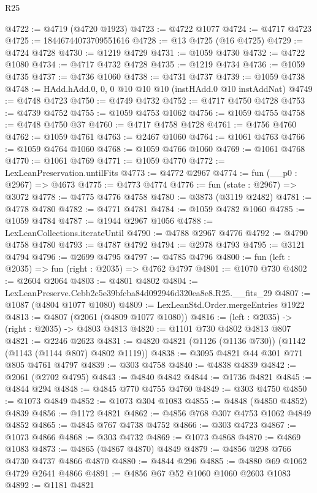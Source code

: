 \begin{lexlean}{R25}
\begin{coremodule}
@4722 := @4719 (@4720 @1923)
@4723 := @4722 @1077
@4724 := @4717 @4723
@4725 := 18446744073709551616
@4728 := @13 @4725 (@16 @4725)
@4729 := @4724 @4728
@4730 := @1219 @4729
@4731 := @1059 @4730
@4732 := @4722 @1080
@4734 := @4717 @4732 @4728
@4735 := @1219 @4734
@4736 := @1059 @4735
@4737 := @4736 @1060
@4738 := @4731 @4737
@4739 := @1059 @4738
@4748 := HAdd.hAdd.{0, 0, 0} @10 @10 @10 (instHAdd.{0} @10 instAddNat)
@4749 := @4748 @4723
@4750 := @4749 @4732
@4752 := @4717 @4750 @4728
@4753 := @4739 @4752
@4755 := @1059 @4753 @1062
@4756 := @1059 @4755
@4758 := @4748 @4750 @37
@4760 := @4717 @4758 @4728
@4761 := @4756 @4760
@4762 := @1059 @4761
@4763 := @2467 @1060
@4764 := @1061 @4763
@4766 := @1059 @4764 @1060
@4768 := @1059 @4766 @1060
@4769 := @1061 @4768
@4770 := @1061 @4769
@4771 := @1059 @4770
@4772 := LexLeanPreservation.untilFits
@4773 := @4772 @2967
@4774 := fun (__p0 : @2967) => @4673
@4775 := @4773 @4774
@4776 := fun (state : @2967) => @3072
@4778 := @4775 @4776 @4758
@4780 := @3873 (@3119 @2482)
@4781 := @4778 @4780
@4782 := @4771 @4781
@4784 := @1059 @4782 @1060
@4785 := @1059 @4784
@4787 := @1944 @2967 @1056
@4788 := LexLeanCollections.iterateUntil
@4790 := @4788 @2967 @4776
@4792 := @4790 @4758 @4780
@4793 := @4787 @4792
@4794 := @2978 @4793
@4795 := @3121 @4794
@4796 := @2699 @4795
@4797 := @4785 @4796
@4800 := fun (left : @2035) => fun (right : @2035) => @4762 @4797
@4801 := @1070 @730
@4802 := @2604 @2064
@4803 := @4801 @4802
@4804 := LexLeanPreserve.Cebb2c5e39bfcba84d092946d320ea8e8.R25.__fits_29
@4807 := @1087 (@4804 @1077 @1080)
@4809 := LexLeanStd.Order.mergeEntries @1922
@4813 := @4807 (@2061 (@4809 @1077 @1080))
@4816 := (left : @2035) -> (right : @2035) -> @4803 @4813
@4820 := @1101 @730 @4802 @4813 @807
@4821 := @2246 @2623
@4831 := @4820 @4821 (@1126 (@1136 @730)) (@1142 (@1143 (@1144 @807) @4802 @1119))
@4838 := @3095 @4821 @44 @301 @771 @805 @4761 @4797
@4839 := @303 @4758
@4840 := @4838 @4839
@4842 := @2061 (@2702 @4795)
@4843 := @4840 @4842
@4844 := @1736 @4821
@4845 := @4844 @294
@4848 := @4845 @770 @4755 @4760
@4849 := @303 @4750
@4850 := @1073 @4849
@4852 := @1073 @304 @1083
@4855 := @4848 (@4850 @4852) @4839
@4856 := @1172 @4821
@4862 := @4856 @768 @307 @4753 @1062 @4849 @4852
@4865 := @4845 @767 @4738 @4752
@4866 := @303 @4723
@4867 := @1073 @4866
@4868 := @303 @4732
@4869 := @1073 @4868
@4870 := @4869 @1083
@4873 := @4865 (@4867 @4870) @4849
@4879 := @4856 @298 @766 @4730 @4737 @4866 @4870
@4880 := @4844 @296
@4885 := @4880 @69 @1062 @4729 @2641 @4866
@4891 := @4856 @67 @52 @1060 @1060 @2603 @1083
@4892 := @1181 @4821

\end{coremodule}
\end{lexlean}
